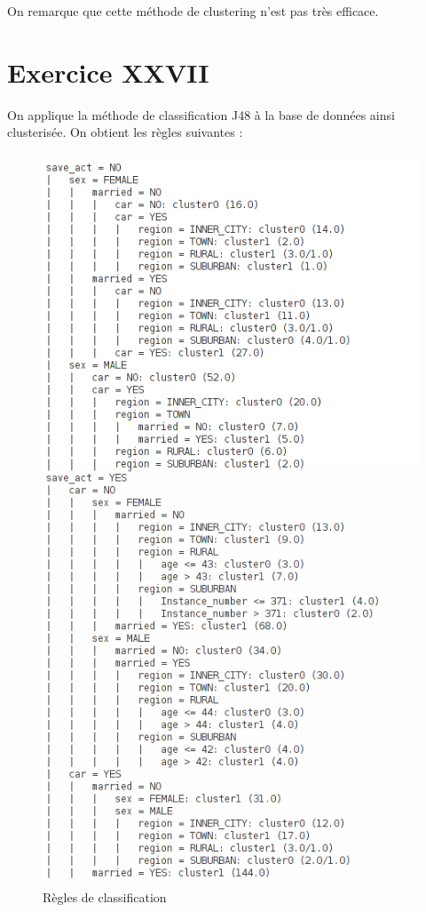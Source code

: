 \documentclass[a4paper, 11pt]{report}
\begin{document}
        On remarque que cette méthode de clustering n'est pas très efficace.
        
        
        \section{Exercice XXVII}
        On applique la méthode de classification J48 à la base de données ainsi clusterisée. On obtient les règles suivantes :
        \begin{figure}[h!]
        \centering
        \includegraphics[scale=0.4]{regles27}
        \caption{Règles de classification}
        \label{fig:exo27}
        \end{figure}
\end{document}
